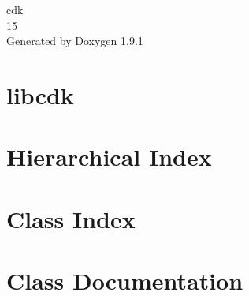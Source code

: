 \let\mypdfximage\pdfximage\def\pdfximage{\immediate\mypdfximage}\documentclass[twoside]{book}
\newcommand{\+}{\discretionary{\mbox{\scriptsize$\hookleftarrow$}}{}{}}
\newcommand{\clearemptydoublepage}{%
  \newpage{\pagestyle{empty}\cleardoublepage}%
}
\begin{document}
\raggedbottom

\begin{titlepage}
\vspace*{7cm}
\begin{center}%
{\Large cdk \\[1ex]\large 15 }\\
\vspace*{1cm}
{\large Generated by Doxygen 1.9.1}\\
\end{center}
\end{titlepage}
\clearemptydoublepage
{}
\tableofcontents
\clearemptydoublepage
{}

\chapter{libcdk}
\label{md_README}

\chapter{Hierarchical Index}

\chapter{Class Index}

\chapter{Class Documentation}


















































\backmatter
\newpage
{}
\clearemptydoublepage
{}
\printindex
\end{document}
